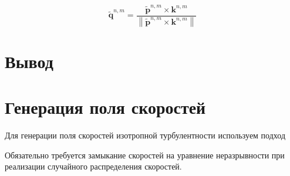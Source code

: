 \documentclass[12pt,a4paper]{article}
\begin{document}
\begin{equation}
 	\boldsymbol{\tilde{q}}^{n,m} = \frac{\boldsymbol{\tilde{p}}^{n,m} \times \boldsymbol{k}^{n,m} }{\left\|\boldsymbol{\tilde{p}}^{n,m} \times \boldsymbol{k}^{n,m} \right\|}
\end{equation}

\section*{Вывод}

\section{Генерация поля скоростей}

Для генерации поля скоростей изотропной турбулентности используем подход 


Обязательно требуется замыкание скоростей на уравнение неразрывности при реализации случайного распределения скоростей.

\medskip



\end{document}

